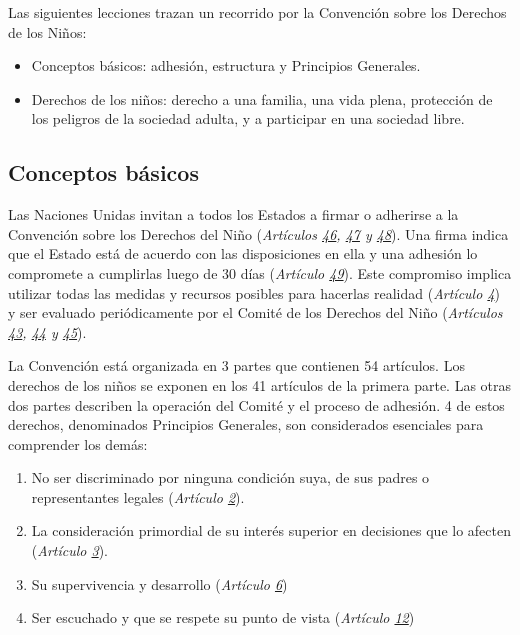 \documentclass{tufte-handout}
\begin{document}
Las siguientes lecciones trazan un recorrido por la Convención sobre los Derechos de los Niños:

\bigskip

\begin{itemize}
\item{Conceptos básicos: adhesión, estructura y Principios Generales.}
\item{Derechos de los niños: derecho a una familia, una vida plena, protección de los peligros de la sociedad adulta, y a participar en una sociedad libre.}
\end{itemize}

\subsection{Conceptos básicos}\label{subsec:conceptos}


Las Naciones Unidas invitan a todos los Estados a firmar o adherirse a la Convención sobre los Derechos del Niño (\textit{Artículos \href{https://procosi.github.io/nenes/convencion/?a=46}{46}, \href{https://procosi.github.io/nenes/convencion/?a=47}{47} y \href{https://procosi.github.io/nenes/convencion/?a=48}{48}}). Una firma indica que el Estado está de acuerdo con las disposiciones en ella y una adhesión lo compromete a cumplirlas luego de 30 días (\textit{Artículo \href{https://procosi.github.io/nenes/convencion/?a=49}{49}}). Este compromiso implica utilizar todas las medidas y recursos posibles para hacerlas realidad (\textit{Artículo \href{https://procosi.github.io/nenes/convencion/?a=4}{4}}) y ser evaluado periódicamente por el Comité de los Derechos del Niño (\textit{Artículos \href{https://procosi.github.io/nenes/convencion/?a=43}{43}, \href{https://procosi.github.io/nenes/convencion/?a=44}{44} y \href{https://procosi.github.io/nenes/convencion/?a=45}{45}}).

La Convención está organizada en 3 partes que contienen 54 artículos. Los derechos de los niños se exponen en los 41 artículos de la primera parte. Las otras dos partes describen la operación del Comité y el proceso de adhesión. 4 de estos derechos, denominados Principios Generales, son considerados esenciales para comprender los demás:

\begin{enumerate}
\item{No ser discriminado por ninguna condición suya, de sus padres o representantes legales (\textit{Artículo \href{https://procosi.github.io/nenes/convencion/?a=2}{2}}).}
\item{La consideración primordial de su interés superior en decisiones que lo afecten (\textit{Artículo \href{https://procosi.github.io/nenes/convencion/?a=3}{3}}).}
\item{Su supervivencia y desarrollo (\textit{Artículo \href{https://procosi.github.io/nenes/convencion/?a=6}{6}})}
\item{Ser escuchado y que se respete su punto de vista (\textit{Artículo \href{https://procosi.github.io/nenes/convencion/?a=12}{12}})}
\end{enumerate}
\end{document}
